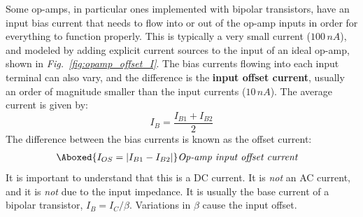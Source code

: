 Some op-amps, in particular ones implemented with bipolar transistors, have an input bias current that needs to flow into or out of the op-amp inputs in order for everything to function properly. This is typically a very small current ($100\,nA$), and modeled by adding explicit current sources to the input of an ideal op-amp, shown in \emph{Fig.~\ref{fig:opamp_offset_I}}.  The bias currents flowing into each input terminal can also vary, and the difference is the \textbf{input offset current}, usually an order of magnitude smaller than the input currents ($10\,nA$).  The average current is given by:
\begin{equation}
       I_B = \frac{I_{B1} + I_{B2}}{2}
\end{equation}
The difference between the bias currents is known as the offset current:
\begin{align}
        \Aboxed{I_{OS} = \left|I_{B1} - I_{B2}\right|}
        &\textit{Op-amp input offset current}
\end{align}
It is important to understand that this is a DC current.  It is \textit{not} an AC current, and it is \textit{not} due to the input impedance.  It is usually the base current of a bipolar transistor, $I_B = I_C/\beta$.  Variations in $\beta$ cause the input offset.
